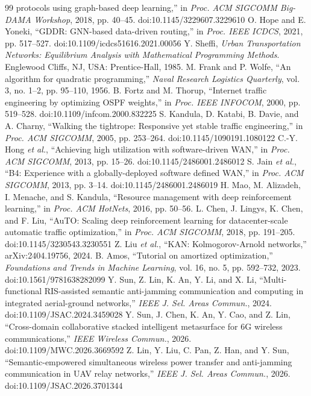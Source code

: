 \documentclass[journal]{IEEEtran}
\begin{document}
\begin{thebibliography}{99}
protocols using graph-based deep learning,'' in \emph{Proc. ACM SIGCOMM Big-DAMA
Workshop}, 2018, pp. 40--45. doi:10.1145/3229607.3229610
 O. Hope and E. Yoneki, ``GDDR: GNN-based data-driven routing,'' in
\emph{Proc. IEEE ICDCS}, 2021, pp. 517--527. doi:10.1109/icdcs51616.2021.00056
 Y. Sheffi, \emph{Urban Transportation Networks: Equilibrium Analysis with
Mathematical Programming Methods}. Englewood Cliffs, NJ, USA: Prentice-Hall, 1985.
 M. Frank and P. Wolfe, ``An algorithm for quadratic programming,''
\emph{Naval Research Logistics Quarterly}, vol. 3, no. 1--2, pp. 95--110, 1956.
 B. Fortz and M. Thorup, ``Internet traffic engineering by optimizing OSPF
weights,'' in \emph{Proc. IEEE INFOCOM}, 2000, pp. 519--528. doi:10.1109/infcom.2000.832225
 S. Kandula, D. Katabi, B. Davie, and A. Charny, ``Walking the tightrope:
Responsive yet stable traffic engineering,'' in \emph{Proc. ACM SIGCOMM}, 2005, pp. 253--264. doi:10.1145/1090191.1080122
 C.-Y. Hong \emph{et al.}, ``Achieving high utilization with software-driven
WAN,'' in \emph{Proc. ACM SIGCOMM}, 2013, pp. 15--26. doi:10.1145/2486001.2486012
 S. Jain \emph{et al.}, ``B4: Experience with a globally-deployed software
defined WAN,'' in \emph{Proc. ACM SIGCOMM}, 2013, pp. 3--14. doi:10.1145/2486001.2486019
 H. Mao, M. Alizadeh, I. Menache, and S. Kandula, ``Resource management
with deep reinforcement learning,'' in \emph{Proc. ACM HotNets}, 2016, pp. 50--56.
 L. Chen, J. Lingys, K. Chen, and F. Liu, ``AuTO: Scaling deep reinforcement
learning for datacenter-scale automatic traffic optimization,'' in \emph{Proc. ACM
SIGCOMM}, 2018, pp. 191--205. doi:10.1145/3230543.3230551
 Z. Liu \emph{et al.}, ``KAN: Kolmogorov-Arnold networks,''
arXiv:2404.19756, 2024.
 B. Amos, ``Tutorial on amortized optimization,'' \emph{Foundations and
Trends in Machine Learning}, vol. 16, no. 5, pp. 592--732, 2023. doi:10.1561/9781638282099
 Y. Sun, Z. Lin, K. An, Y. Li, and X. Li, ``Multi-functional
RIS-assisted semantic anti-jamming communication and computing in integrated
aerial-ground networks,'' \emph{IEEE J. Sel. Areas Commun.}, 2024.
doi:10.1109/JSAC.2024.3459028
 Y. Sun, J. Chen, K. An, Y. Cao, and Z. Lin, ``Cross-domain
collaborative stacked intelligent metasurface for 6G wireless communications,''
\emph{IEEE Wireless Commun.}, 2026. doi:10.1109/MWC.2026.3669592
 Z. Lin, Y. Liu, C. Pan, Z. Han, and Y. Sun,
``Semantic-empowered simultaneous wireless power transfer and anti-jamming
communication in UAV relay networks,'' \emph{IEEE J. Sel. Areas Commun.}, 2026.
doi:10.1109/JSAC.2026.3701344
\end{thebibliography}
\end{document}
